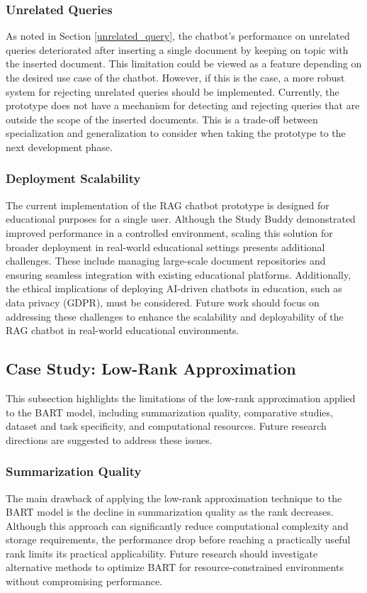 \subsubsection{Unrelated Queries}
As noted in Section \ref{unrelated_query}, the chatbot's performance on unrelated queries deteriorated after inserting a single document by keeping on topic with the inserted document. This limitation could be viewed as a feature depending on the desired use case of the chatbot. However, if this is the case, a more robust system for rejecting unrelated queries should be implemented. Currently, the prototype does not have a mechanism for detecting and rejecting queries that are outside the scope of the inserted documents. This is a trade-off between specialization and generalization to consider when taking the prototype to the next development phase.

\subsubsection{Deployment Scalability}
The current implementation of the RAG chatbot prototype is designed for educational purposes for a single user. Although the Study Buddy demonstrated improved performance in a controlled environment, scaling this solution for broader deployment in real-world educational settings presents additional challenges. These include managing large-scale document repositories and ensuring seamless integration with existing educational platforms. Additionally, the ethical implications of deploying AI-driven chatbots in education, such as data privacy (GDPR), must be considered. Future work should focus on addressing these challenges to enhance the scalability and deployability of the RAG chatbot in real-world educational environments.

\subsection{Case Study: Low-Rank Approximation}
This subsection highlights the limitations of the low-rank approximation applied to the BART model, including summarization quality, comparative studies, dataset and task specificity, and computational resources. Future research directions are suggested to address these issues.
\subsubsection{Summarization Quality}
The main drawback of applying the low-rank approximation technique to the BART model is the decline in summarization quality as the rank decreases. Although this approach can significantly reduce computational complexity and storage requirements, the performance drop before reaching a practically useful rank limits its practical applicability. Future research should investigate alternative methods to optimize BART for resource-constrained environments without compromising performance.

